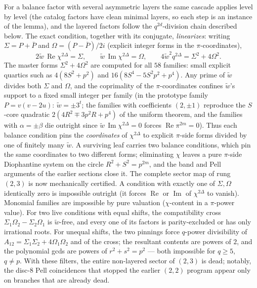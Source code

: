 \documentclass[11pt]{article}
\theoremstyle{remark}
\DeclareMathOperator{\im}{Im}
\DeclareMathOperator{\re}{Re}
\begin{document}
For a balance factor with several asymmetric layers the same cascade
applies level by level (the catalog factors have clean minimal layers, so
each step is an instance of the lemma), and the layered factors follow the
$q^{2d}$-division chain described below.  The exact condition, together
with its conjugate, \emph{linearizes}: writing $\Sigma=P+\bar P$ and $\Omega=(P-\bar P)/2i$
(explicit integer forms in the $\pi$-coordinates),
\[
  2\tilde w\,\re\chi^{2\Delta}=\Sigma,\qquad
  \tilde w\,\im\chi^{2\Delta}=\Omega,\qquad
  4\tilde w^2 q^{2\Delta}=\Sigma^2+4\Omega^2 .
\]
The master forms $\Sigma^2+4\Omega^2$ are computed for all $58$ families:
small explicit quartics such as $4(8S^2+p^2)$ and
$16(8S^4-5S^2p^2+p^4)$.  Any prime of $\tilde w$ divides both $\Sigma$ and
$\Omega$, and the coprimality of the $\pi$-coordinates confines
$\tilde w$'s support to a fixed small integer per family (in the prototype
family $P=v(v-2u)$: $\tilde w=\pm3^t$; the families with coefficients
$(2,\pm1)$ reproduce the $S$-core quadratic $2(4R^2\mp3p^2R+p^4)$ of the
uniform theorem, and the families with $\alpha=\pm\beta$ die outright since
$\tilde w\,\im\chi^{2\Delta}=0$ forces $\re\pi^{2m}=0$).  Thus each balance
condition pins the \emph{coordinates} of $\chi^{2\Delta}$ to explicit
$\pi$-side forms divided by one of finitely many $\tilde w$.  A surviving
leaf carries two balance conditions, which pin the same coordinates to two
different forms; eliminating $\chi$ leaves a pure $\pi$-side Diophantine
system on the circle $R^2+S^2=p^{2m}$, and the band and Pell arguments of
the earlier sections close it.  The complete sector map of rung $(2,3)$ is now mechanically certified.
A condition with exactly one of $\Sigma,\Omega$ identically zero is
impossible outright (it forces $\re$ or $\im$ of $\chi^{2\Delta}$ to
vanish).  Monomial families are impossible by pure valuation ($\chi$-content
in a $\pi$-power value).  For two live conditions with equal shifts, the
compatibility cross $\Sigma_1\Omega_2-\Sigma_2\Omega_1$ is
$\tilde w$-free, and every one of its factors is parity-excluded or has
only irrational roots.  For unequal shifts, the two pinnings force
$q$-power divisibility of $A_{12}=\Sigma_1\Sigma_2+4\Omega_1\Omega_2$ and
of the cross; the resultant contents are powers of $2$, and the polynomial
gcds are powers of $r^2+s^2=p^{2}$ --- both impossible for $q\ge5$,
$q\neq p$.  With these filters, the entire non-layered sector of $(2,3)$
is dead; notably, the disc-$8$ Pell coincidences that stopped the earlier
$(2,2)$ program appear only on branches that are already dead.
\end{document}
